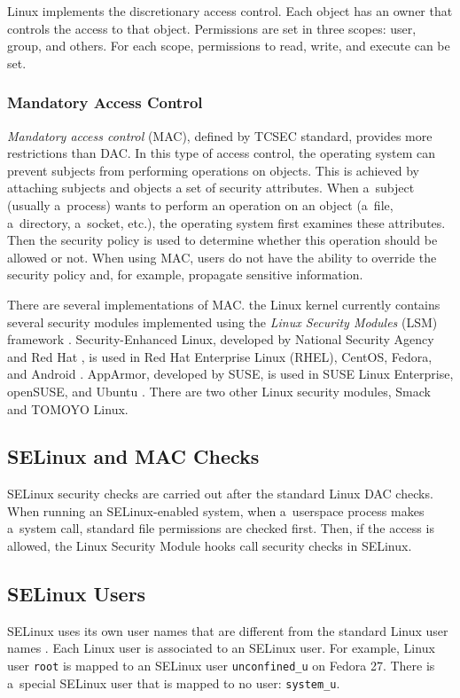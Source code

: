 Linux implements the discretionary access control. Each object has an owner
that controls the access to that object. Permissions are set in three scopes:
user, group, and others. For each scope, permissions to read, write, and execute
can be set.

\subsubsection{Mandatory Access Control}
\emph{Mandatory access control} (MAC), defined by TCSEC standard, provides more
restrictions than DAC. In this type of access control, the operating system can
prevent subjects from performing operations on objects. This is achieved by
attaching subjects and objects a set of security attributes. When a~subject
(usually a~process) wants to perform an operation on an object (a~file,
a~directory, a~socket, etc.), the operating system first examines these
attributes. Then the security policy is used to determine whether this operation
should be allowed or not. When using MAC, users do not have the ability to
override the security policy and, for example, propagate sensitive information.

There are several implementations of MAC. the Linux kernel currently contains
several security modules implemented using the \emph{Linux Security Modules}
(LSM) framework \cite{lsmusage}. Security-Enhanced Linux, developed by National
Security Agency and Red Hat \cite{selinuxcontr}, is used in Red Hat Enterprise
Linux (RHEL), CentOS, Fedora, and Android
\cite{selinuxguide,selinuxguidefedora,selinuxandroid}. AppArmor, developed by
SUSE, is used in SUSE Linux Enterprise, openSUSE, and Ubuntu
\cite{apparmor,apparmorubuntu}. There are two other Linux security modules,
Smack and TOMOYO Linux.

\subsection{SELinux and MAC Checks}
SELinux security checks are carried out after the standard Linux DAC checks.
When running an SELinux-enabled system, when a~userspace process makes a~system
call, standard file permissions are checked first. Then, if the access is
allowed, the Linux Security Module hooks call security checks in SELinux.

\subsection{SELinux Users}
\label{selinuxuser}
SELinux uses its own user names that are different from the standard Linux user
names \cite[p.~24]{tsn}. Each Linux user is associated to an SELinux user. For
example, Linux user \texttt{root} is mapped to an SELinux user
\texttt{unconfined\_u} on Fedora 27. There is a~special SELinux user that is
mapped to no user: \texttt{system\_u}.

